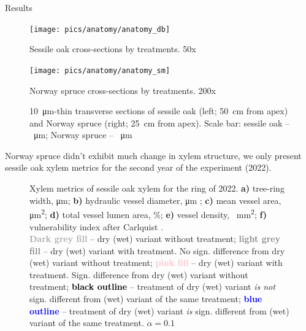 \documentclass[final]{beamer}
\newlength{\colwidth}
\begin{document}
\begin{frame}[t]
\begin{columns}[t]
\begin{column}{\colwidth}
\begin{block}{Results}
    \begin{figure}
        \begin{minipage}{0.5\textwidth}
            \centering \texttt{[image: pics/anatomy/anatomy\_db]}
            \caption*{Sessile oak cross-sections by treatments. 50x}
            \label{fig:anatomy_db}
        \end{minipage}\hfill
        \begin{minipage}{0.5\textwidth}
            \centering \texttt{[image: pics/anatomy/anatomy\_sm]}
            \caption*{Norway spruce cross-sections by treatments. 200x}
            \label{fig:anatomy_sm}
        \end{minipage}\hfill
        \caption{\SI{10}{\micro\meter}-thin transverse sections of sessile oak (left; \SI{50}{\centi\meter} from apex) and Norway spruce (right; \SI{25}{\centi\meter} from apex). Scale bar: sessile oak -- \SI{}{\micro\meter}; Norway spruce -- \SI{}{\micro\meter}}
        \label{fig:anatomy}
    \end{figure}

    Norway spruce didn't exhibit much change in xylem structure, we only present sessile oak xylem metrics for the second year of the experiment (2022).
    \begin{figure}
        
        \caption{
            Xylem metrics of sessile oak xylem for the ring of 2022.
            \textbf{a)} tree-ring width, \si{\micro\meter};
            \textbf{b)} hydraulic vessel diameter, \si{\micro\meter} \parencite{tyree2002};
            \textbf{c)} mean vessel area, \si{\micro\meter\squared};
            \textbf{d)} total vessel lumen area, \%;
            \textbf{e)} vessel density, \si{\per\milli\meter\squared};
            \textbf{f)} vulnerability index after Carlquist \parencite{carlquist1977}. \\
            \textbf{\textcolor{darkgray}{Dark grey fill}} -- dry (wet) variant without treatment;
            \textbf{\textcolor{gray}{light grey fill}} -- dry (wet) variant with treatment. No sign. difference from dry (wet) variant without treatment;
            \textbf{\textcolor{pink}{pink fill}} -- dry (wet) variant with treatment. Sign. difference from dry (wet) variant without treatment;
            \textbf{\textcolor{black}{black outline}} -- treatment of dry (wet) variant \emph{is not} sign. different from (wet) variant of the same treatment;
            \textbf{\textcolor{blue}{blue outline}} -- treatment of dry (wet) variant \emph{is} sign. different from (wet) variant of the same treatment.
            $\alpha = 0.1$
        }
        \label{fig:oak_box}
    \end{figure}


\end{block}
\end{column}
\end{columns}
\end{frame}
\end{document}
